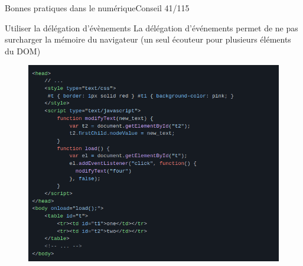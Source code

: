 \begin{frame}{Bonnes pratiques dans le numérique}{Conseil 41/115}
\begin{block}{Utiliser la délégation d'évènements}
La délégation d’événements permet de ne pas surcharger la mémoire du navigateur (un seul écouteur pour plusieurs éléments du DOM)

   \begin{figure}
    \includegraphics[scale=0.3]{chapitre2/wdd4/fig/c4.png}
\end{figure} 
\end{block}
\end{frame}




